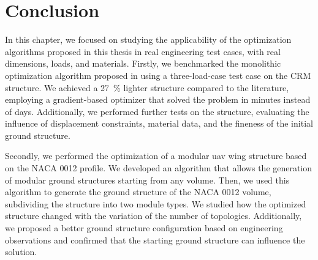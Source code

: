 \section{Conclusion}
In this chapter, we focused on studying the applicability of the optimization algorithms proposed in this thesis in real engineering test cases, with real dimensions, loads, and materials. Firstly, we benchmarked the monolithic optimization algorithm proposed in  using a three-load-case test case on the CRM structure. We achieved a \qty{27}{\percent} lighter structure compared to the literature, employing a gradient-based optimizer that solved the problem in minutes instead of days. Additionally, we performed further tests on the structure, evaluating the influence of displacement constraints, material data, and the fineness of the initial ground structure.

Secondly, we performed the optimization of a modular \gls{uav} wing structure based on the NACA 0012 profile. We developed an algorithm that allows the generation of modular ground structures starting from any volume. Then, we used this algorithm to generate the ground structure of the NACA 0012 volume, subdividing the structure into two module types. We studied how the optimized structure changed with the variation of the number of topologies. Additionally, we proposed a better ground structure configuration based on engineering observations and confirmed that the starting ground structure can influence the solution.